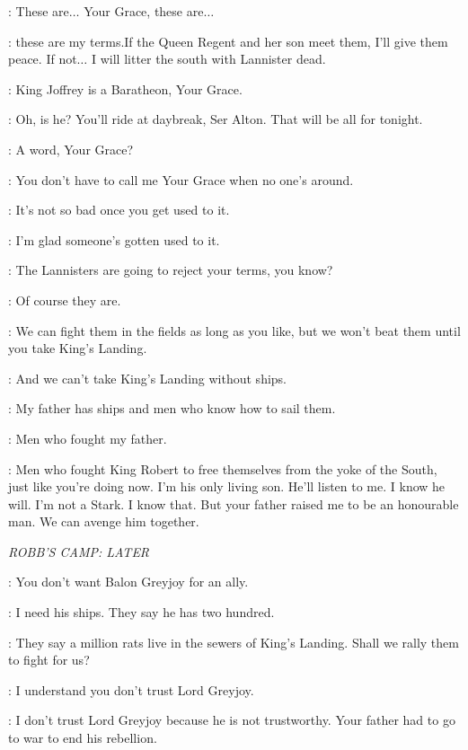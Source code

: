 \ALTON: These are$\ldots$ Your Grace, these are$\ldots$

\ROBB: these are my terms.If the Queen Regent and her son meet them, I'll give them peace. If not$\ldots$ I will litter the south with Lannister dead.

\ALTON: King Joffrey is a Baratheon, Your Grace.

\ROBB: Oh, is he? You'll ride at daybreak, Ser Alton. That will be all for tonight.


\THEON: A word, Your Grace?

\ROBB: You don't have to call me Your Grace when no one's around.

\THEON: It's not so bad once you get used to it.

\ROBB: I'm glad someone's gotten used to it.

\THEON: The Lannisters are going to reject your terms, you know?

\ROBB: Of course they are.

\THEON: We can fight them in the fields as long as you like, but we won't beat them until you take King's Landing.

\ROBB: And we can't take King's Landing without ships.

\THEON: My father has ships and men who know how to sail them.

\ROBB: Men who fought my father.

\THEON: Men who fought King Robert to free themselves from the yoke of the South, just like you're doing now. I'm his only living son. He'll listen to me. I know he will. I'm not a Stark. I know that. But your father raised me to be an honourable man. We can avenge him together.


\scene

\textit{ROBB'S CAMP: LATER}


\CATELYN: You don't want Balon Greyjoy for an ally.

\ROBB: I need his ships. They say he has two hundred.

\CATELYN: They say a million rats live in the sewers of King's Landing. Shall we rally them to fight for us?

\ROBB: I understand you don't trust Lord Greyjoy.

\CATELYN: I don't trust Lord Greyjoy because he is not trustworthy. Your father had to go to war to end his rebellion.

